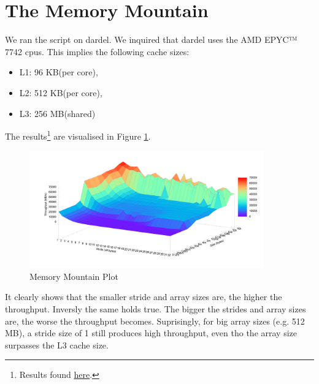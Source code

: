 \documentclass[a4paper,10pt]{article}
\begin{document}
\section{The Memory Mountain}
  We ran the script on dardel.
  We inquired that dardel uses the AMD EPYC™ 7742 cpus.
  This implies the following cache sizes:
  \begin{itemize}
  \item L1: 96 KB(per core), 
  \item L2: 512 KB(per core),
  \item L3: 256 MB(shared)
  \end{itemize}
  The results\footnote{Results found \href{https://github.com/paulmyr/DD2356-MethodsHPC/blob/master/1\_dardel\_simple\_benchmarking/misc/results.txt}{here}.} are visualised in Figure \ref{fig:mem_mountain}.
  \begin{figure}[H]
    \centering
    \includegraphics[width=0.9\textwidth]{images/memory_mountain}
    \caption{Memory Mountain Plot}
    \label{fig:mem_mountain}
  \end{figure}
  It clearly shows that the smaller stride and array sizes are, the higher the throughput.
  Inversly the same holds true.
  The bigger the strides and array sizes are, the worse the throughput becomes.
  Suprisingly, for big array sizes (e.g. 512 MB), a stride size of 1 still produces high throughput, even tho the array size surpasses the L3 cache size.
\end{document}
